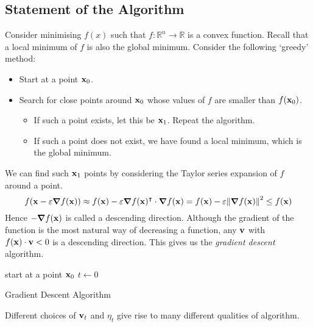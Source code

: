 \subsection{Statement of the Algorithm}
Consider minimising \(f(x)\) such that \(f \colon \mathbb R^n \to \mathbb R\) is a convex function.
Recall that a local minimum of \(f\) is also the global minimum.
Consider the following `greedy' method:
\begin{itemize}
	\item Start at a point \(\vb x_0\).
	\item Search for close points around \(\vb x_0\) whose values of \(f\) are smaller than \(f(\vb x_0)\).
	      \begin{itemize}
		      \item If such a point exists, let this be \(\vb x_1\).
		            Repeat the algorithm.
		      \item If such a point does not exist, we have found a local minimum, which is the global minimum.
	      \end{itemize}
\end{itemize}
We can find such \(\vb x_1\) points by considering the Taylor series expansion of \(f\) around a point.
\[
	f(\vb x - \varepsilon\grad{f(\vb x)}) \approx f(\vb x) - \varepsilon \grad{f(\vb x)}^\intercal \cdot \grad{f(\vb x)} = f(\vb x) - \varepsilon\norm{\grad{f(\vb x)}}^2 \leq f(\vb x)
\]
Hence \(-\grad{f(\vb x)}\) is called a descending direction.
Although the gradient of the function is the most natural way of decreasing a function, any \(\vb v\) with \(f(\vb x) \cdot \vb v < 0\) is a descending direction.
This gives us the \textit{gradient descent} algorithm.

\begin{algorithm*}[H]
	\SetAlgoLined{}
	start at a point \(\vb x_0\)\;
	\(t \leftarrow 0\)\;
	\caption{Gradient Descent Algorithm}
\end{algorithm*}

\noindent Different choices of \(\vb v_t\) and \(\eta_t\) give rise to many different qualities of algorithm.

